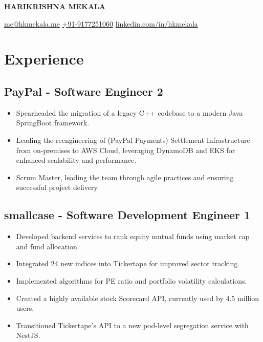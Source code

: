 \documentclass[11pt]{article}
\begin{document}
\begin{center}
  {\Huge\bfseries\uppercase{Harikrishna Mekala}} \\ \medskip

  \href{mailto:me@hkmekala.me}{me@hkmekala.me} \quad
  \href{tel:+919177251060}{+91-9177251060} \quad
  \href{https://www.linkedin.com/in/hkmekala}{linkedin.com/in/hkmekala}
\end{center}

\section{Experience}
\subsection{\textbf{PayPal} - Software Engineer 2  }
\begin{itemize}
	\item Spearheaded the migration of a legacy C++ codebase to a modern Java SpringBoot framework.
	\item Leading the reengineering of (PayPal Payments) Settlement Infrastructure from on-premises to AWS Cloud, leveraging DynamoDB and EKS for enhanced scalability and performance.
    \item Scrum Master, leading the team through agile practices and ensuring successful project delivery.
\end{itemize}

\subsection{\textbf{smallcase} - Software Development Engineer 1  }
\begin{itemize}
    \item Developed backend services to rank equity mutual funds using market cap and fund allocation.
    \item Integrated 24 new indices into Tickertape for improved sector tracking.
    \item Implemented algorithms for PE ratio and portfolio volatility calculations.
    \item Created a highly available stock Scorecard API, currently used by 4.5 million users.
    \item Transitioned Tickertape’s API to a new pod-level segregation service with NestJS.
\end{itemize}
\end{document}
